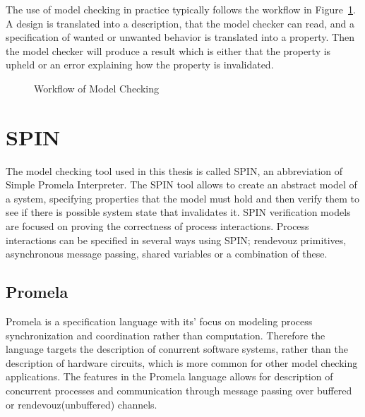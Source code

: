 
The use of model checking in practice typically follows the workflow in Figure~\ref{fig:mc_workflow}. A design is translated into a description, that the model checker can read, and a specification of wanted or unwanted behavior is translated into a property. Then the model checker will produce a result which is either that the property is upheld or an error explaining how the property is invalidated. 

\begin{figure}[ht]
    \caption{Workflow of Model Checking}
    \label{fig:mc_workflow}
\end{figure}

\section{SPIN}

The model checking tool used in this thesis is called SPIN, an abbreviation of Simple Promela Interpreter. The SPIN tool allows to create an abstract model of a system, specifying properties that the model must hold and then verify them to see if there is possible system state that invalidates it. SPIN verification models are focused on proving the correctness of process interactions.\cite{holzmann1997model} Process interactions can be specified in several ways using SPIN; rendevouz primitives, asynchronous message passing, shared variables or a combination of these. 



\subsection{Promela}
Promela is a specification language with its' focus on modeling process synchronization and coordination rather than computation. Therefore the language targets the description of conurrent software systems, rather than the description of hardware circuits, which is more common for other model checking applications\cite{holzmann1997model}.
The features in the Promela language allows for description of concurrent processes and communication through message passing over buffered or rendevouz(unbuffered) channels.  

